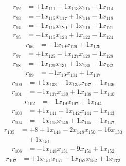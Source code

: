 \[\begin{aligned}
r_{92} &= + 1 x_{111} - 1 x_{113} x_{115} - 1 x_{114}
\end{aligned}\]
\[\begin{aligned}
r_{93} &= - 1 x_{115} x_{117} + 1 x_{116} - 1 x_{118}
\end{aligned}\]
\[\begin{aligned}
r_{94} &= - 1 x_{115} x_{120} + 1 x_{119} - 1 x_{121}
\end{aligned}\]
\[\begin{aligned}
r_{95} &= - 1 x_{115} x_{123} + 1 x_{122} - 1 x_{124}
\end{aligned}\]
\[\begin{aligned}
r_{96} &= - 1 x_{19} x_{126} + 1 x_{129}
\end{aligned}\]
\[\begin{aligned}
r_{97} &= + 1 x_{125} - 1 x_{127} x_{129} - 1 x_{128}
\end{aligned}\]
\[\begin{aligned}
r_{98} &= - 1 x_{129} x_{131} + 1 x_{130} - 1 x_{132}
\end{aligned}\]
\[\begin{aligned}
r_{99} &= - 1 x_{19} x_{134} + 1 x_{137}
\end{aligned}\]
\[\begin{aligned}
r_{100} &= + 1 x_{133} - 1 x_{135} x_{137} - 1 x_{136}
\end{aligned}\]
\[\begin{aligned}
r_{101} &= - 1 x_{137} x_{139} + 1 x_{138} - 1 x_{140}
\end{aligned}\]
\[\begin{aligned}
r_{102} &= - 1 x_{19} x_{107} + 1 x_{144}
\end{aligned}\]
\[\begin{aligned}
r_{103} &= + 1 x_{141} - 1 x_{142} x_{144} - 1 x_{143}
\end{aligned}\]
\[\begin{aligned}
r_{104} &= - 1 x_{115} x_{146} + 1 x_{145} - 1 x_{147}
\end{aligned}\]
\[\begin{aligned}
r_{105} &= + 8 + 1 x_{148} - 2 x_{148} x_{150} - 16 x_{150} \\
 &\quad + 1 x_{151}
\end{aligned}\]
\[\begin{aligned}
r_{106} &= - 1 x_{148} x_{151} - 9 x_{151} + 1 x_{152}
\end{aligned}\]
\[\begin{aligned}
r_{107} &= + 1 x_{151} x_{151} - 1 x_{152} x_{152} + 1 x_{172}
\end{aligned}\]
